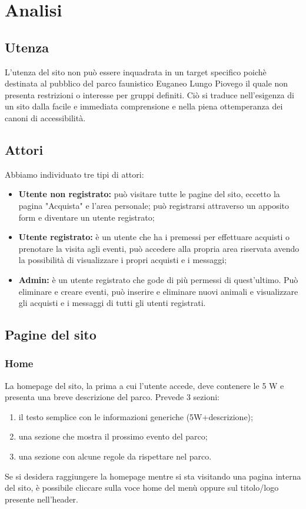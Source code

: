 \section{Analisi}

    \subsection{Utenza}
        L'utenza del sito non può essere inquadrata in un target specifico poichè destinata al pubblico del parco faunistico Euganeo Lungo Piovego il quale non presenta restrizioni o interesse per gruppi definiti. Ciò si traduce nell'esigenza di un sito dalla facile e immediata comprensione e nella piena ottemperanza dei canoni di accessibilità.

    \subsection{Attori}
        Abbiamo individuato tre tipi di attori:
        \begin{itemize}
            \item \textbf{Utente non registrato:} può visitare tutte le pagine del sito, eccetto la pagina "Acquista" e l'area personale; può registrarsi attraverso un apposito form e diventare un utente registrato;
            \item \textbf{Utente registrato:} è un utente che ha i premessi per effettuare acquisti o prenotare la visita agli eventi, può accedere alla propria area riservata avendo la possibilità di visualizzare i propri acquisti e i messaggi;
            \item \textbf{Admin:} è un utente registrato che gode di più permessi di quest'ultimo. Può eliminare e creare eventi, può inserire e eliminare nuovi animali e visualizzare gli acquisti e i messaggi di tutti gli utenti registrati.
        \end{itemize}
    
    \subsection{Pagine del sito}
        \subsubsection{Home}
            La homepage del sito, la prima a cui l'utente accede, deve contenere le 5 W e presenta una breve descrizione del parco.
            Prevede 3 sezioni:
            \begin{enumerate}
                \item il testo semplice con le informazioni generiche (5W+descrizione);
                \item una sezione che mostra il prossimo evento del parco;
                \item una sezione con alcune regole da rispettare nel parco.
            \end{enumerate}
            Se si desidera raggiungere la homepage mentre si sta visitando una pagina interna del sito, è possibile cliccare sulla voce home del menù oppure sul titolo/logo presente nell'header.

